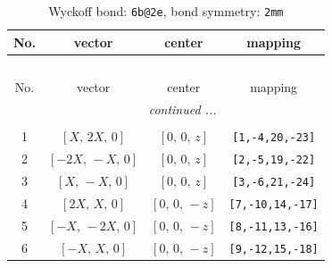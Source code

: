 \documentclass[fleqn,8pt]{jsarticle}
\begin{document}
\renewcommand{\arraystretch}{1.2}
\begin{longtable}{cccc}
\caption{Wyckoff bond: {\tt 6b@2e}, bond symmetry: {\tt 2mm}}
 \\
 \hline \hline
No. & vector & center & mapping \\ \hline \endfirsthead

\multicolumn{3}{l}{\tablename\ \thetable{}} \\
 \hline \hline
No. & vector & center & mapping \\ \hline \endhead

 \hline \hline
\multicolumn{3}{r}{\footnotesize\it continued ...} \\ \endfoot

 \hline \hline
\multicolumn{3}{r}{} \\ \endlastfoot

1 & $\left[ X,\, 2 X,\, 0 \right]$ & $\left[ 0,\, 0,\, z \right]$ & {\tt [1,-4,20,-23]} \\ \hline
2 & $\left[ - 2 X,\, - X,\, 0 \right]$ & $\left[ 0,\, 0,\, z \right]$ & {\tt [2,-5,19,-22]} \\ \hline
3 & $\left[ X,\, - X,\, 0 \right]$ & $\left[ 0,\, 0,\, z \right]$ & {\tt [3,-6,21,-24]} \\ \hline
4 & $\left[ 2 X,\, X,\, 0 \right]$ & $\left[ 0,\, 0,\, - z \right]$ & {\tt [7,-10,14,-17]} \\ \hline
5 & $\left[ - X,\, - 2 X,\, 0 \right]$ & $\left[ 0,\, 0,\, - z \right]$ & {\tt [8,-11,13,-16]} \\ \hline
6 & $\left[ - X,\, X,\, 0 \right]$ & $\left[ 0,\, 0,\, - z \right]$ & {\tt [9,-12,15,-18]} \\
\end{longtable}
\renewcommand{\arraystretch}{1.2}
\end{document}
